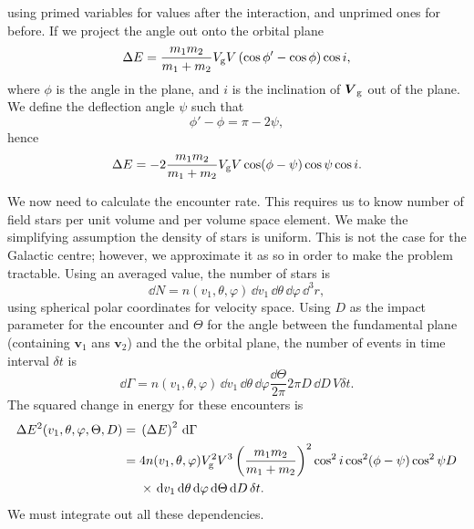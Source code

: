 using primed variables for values after the interaction, and unprimed ones for before. If we project the angle out onto the orbital plane
\begin{equation}
\Delta E = \dfrac{m_1 m_2}{m_1 + m_2}V_\mathrm{g}V\left(\cos\phi' - \cos\phi\right)\cos i,
\end{equation}
where $\phi$ is the angle in the plane, and $i$ is the inclination of $\boldsymbol{V}_\mathrm{g}$ out of the plane. We define the deflection angle $\psi$ such that
\begin{equation}
\phi' - \phi = \pi - 2\psi,
\end{equation}
hence
\begin{equation}
\Delta E = -2\dfrac{m_1 m_2}{m_1 + m_2}V_\mathrm{g}V\cos(\phi - \psi)\cos\psi\cos i.
\end{equation}

We now need to calculate the encounter rate. This requires us to know number of field stars per unit volume and per volume space element. We make the simplifying assumption the density of stars is uniform. This is not the case for the Galactic centre; however, we approximate it as so in order to make the problem tractable. Using an averaged value, the number of stars is
\begin{equation}
\dd N = n(v_1, \theta, \varphi)\,\dd v_1 \,\dd \theta \,\dd \varphi \,\dd^3r,
\end{equation}
using spherical polar coordinates for velocity space. Using $D$ as the impact parameter for the encounter and $\Theta$ for the angle between the fundamental plane (containing $\boldsymbol{v}_1$ ans $\boldsymbol{v}_2$) and the the orbital plane, the number of events in time interval $\delta t$ is
\begin{equation}
\dd \Gamma =  n(v_1, \theta, \varphi)\,\dd v_1 \,\dd \theta \,\dd \varphi \dfrac{\dd \Theta}{2\pi} 2\pi D \,\dd D \,V \delta t.
\end{equation}
The squared change in energy for these encounters is
\begin{align}
\Delta E^2(v_1,\theta,\varphi,\Theta,D) = {} & \left(\Delta E\right)^2\,\mathrm{d} \Gamma\\
 = {} & 4 n(v_1,\theta,\varphi)V_\mathrm{g}^2V^3\left(\dfrac{m_1m_2}{m_1+m_2}\right)^2\cos^2i\cos^2(\phi-\psi)\cos^2\psi D \nonumber \\*
 {} & \times \left. \mathrm{d} v_1\,\mathrm{d}\theta\,\mathrm{d}\varphi\,\mathrm{d}\Theta\,\mathrm{d} D\,\delta t. \right.
\end{align}
We must integrate out all these dependencies.

